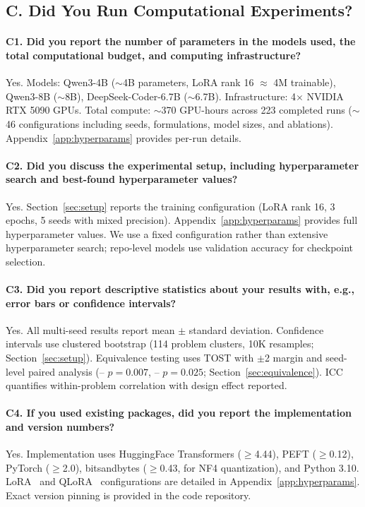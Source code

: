 \subsection*{C. Did You Run Computational Experiments?}

\paragraph{C1. Did you report the number of parameters in the models used, the total computational budget, and computing infrastructure?}
Yes. Models: Qwen3-4B (${\sim}$4B parameters, LoRA rank 16 $\approx$ 4M trainable), Qwen3-8B (${\sim}$8B), DeepSeek-Coder-6.7B (${\sim}$6.7B). Infrastructure: 4$\times$ NVIDIA RTX 5090 GPUs. Total compute: ${\sim}$370 GPU-hours across 223 completed runs (${\sim}$46 configurations including seeds, formulations, model sizes, and ablations). Appendix~\ref{app:hyperparams} provides per-run details.

\paragraph{C2. Did you discuss the experimental setup, including hyperparameter search and best-found hyperparameter values?}
Yes. Section~\ref{sec:setup} reports the training configuration (LoRA rank 16, 3 epochs, 5 seeds with mixed precision). Appendix~\ref{app:hyperparams} provides full hyperparameter values. We use a fixed configuration rather than extensive hyperparameter search; repo-level models use validation accuracy for checkpoint selection.

\paragraph{C3. Did you report descriptive statistics about your results with, e.g., error bars or confidence intervals?}
Yes. All multi-seed results report mean $\pm$ standard deviation. Confidence intervals use clustered bootstrap (114 problem clusters, 10K resamples; Section~\ref{sec:setup}). Equivalence testing uses TOST with $\pm$2\pp{} margin and seed-level paired analysis (\cls{}--\cwm{} $p{=}0.007$, \cls{}--\traj{} $p{=}0.025$; Section~\ref{sec:equivalence}). ICC quantifies within-problem correlation with design effect reported.

\paragraph{C4. If you used existing packages, did you report the implementation and version numbers?}
Yes. Implementation uses HuggingFace Transformers (${\geq}$4.44), PEFT (${\geq}$0.12), PyTorch (${\geq}$2.0), bitsandbytes (${\geq}$0.43, for NF4 quantization), and Python 3.10. LoRA~\cite{hu2022lora} and QLoRA~\cite{dettmers2024qlora} configurations are detailed in Appendix~\ref{app:hyperparams}. Exact version pinning is provided in the code repository.

